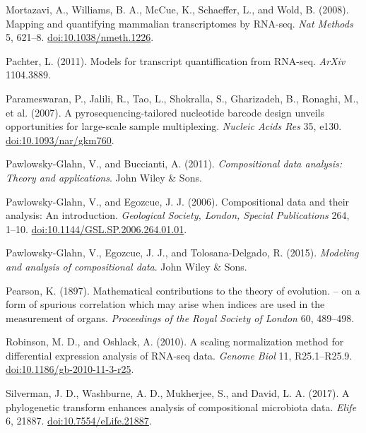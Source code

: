 \documentclass[twocolumn]{article}
\begin{document}
Mortazavi, A., Williams, B. A., McCue, K., Schaeffer, L., and Wold, B.
(2008). Mapping and quantifying mammalian transcriptomes by RNA-seq.
\emph{Nat Methods} 5, 621--8.
\href{http://doi.org/10.1038/nmeth.1226}{doi:10.1038/nmeth.1226}.

Pachter, L. (2011). Models for transcript quantiffication from RNA-seq.
\emph{ArXiv} 1104.3889.

Parameswaran, P., Jalili, R., Tao, L., Shokralla, S., Gharizadeh, B.,
Ronaghi, M., et al. (2007). A pyrosequencing-tailored nucleotide barcode
design unveils opportunities for large-scale sample multiplexing.
\emph{Nucleic Acids Res} 35, e130.
\href{http://doi.org/10.1093/nar/gkm760}{doi:10.1093/nar/gkm760}.

Pawlowsky-Glahn, V., and Buccianti, A. (2011). \emph{Compositional data
analysis: Theory and applications}. John Wiley \& Sons.

Pawlowsky-Glahn, V., and Egozcue, J. J. (2006). Compositional data and
their analysis: An introduction. \emph{Geological Society, London,
Special Publications} 264, 1--10.
\href{http://doi.org/10.1144/GSL.SP.2006.264.01.01}{doi:10.1144/GSL.SP.2006.264.01.01}.

Pawlowsky-Glahn, V., Egozcue, J. J., and Tolosana-Delgado, R. (2015).
\emph{Modeling and analysis of compositional data}. John Wiley \& Sons.

Pearson, K. (1897). Mathematical contributions to the theory of
evolution. -- on a form of spurious correlation which may arise when
indices are used in the measurement of organs. \emph{Proceedings of the
Royal Society of London} 60, 489--498.

Robinson, M. D., and Oshlack, A. (2010). A scaling normalization method
for differential expression analysis of RNA-seq data. \emph{Genome Biol}
11, R25.1--R25.9.
\href{http://doi.org/10.1186/gb-2010-11-3-r25}{doi:10.1186/gb-2010-11-3-r25}.

Silverman, J. D., Washburne, A. D., Mukherjee, S., and David, L. A.
(2017). A phylogenetic transform enhances analysis of compositional
microbiota data. \emph{Elife} 6, 21887.
\href{http://doi.org/10.7554/eLife.21887}{doi:10.7554/eLife.21887}.
\end{document}
